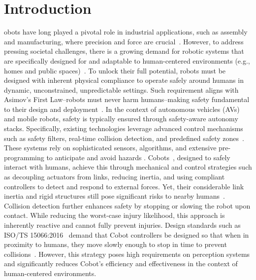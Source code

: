\section{Introduction}
obots have long played a pivotal role in industrial applications, such as assembly and manufacturing, where precision and force are crucial~\citep{todd1996fundamentals}.
However, to address pressing societal challenges, there is a growing demand for robotic systems that are specifically designed for and adaptable to human-centered environments (e.g., homes and public spaces)~\citep{nahavandi2019industry, chibani2013ubiquitous, royakkers2015literature}.
To unlock their full potential, robots must be designed with inherent physical compliance to operate safely around humans in dynamic, unconstrained, unpredictable settings.
Such requirement aligns with Asimov's First Law--robots must never harm humans--making safety fundamental to their design and deployment~\citep{villani2018survey}.
%
In the context of autonomous vehicles (AVs) and mobile robots, safety is typically ensured through safety-aware autonomy stacks. 
Specifically, existing technologies leverage advanced control mechanisms such as safety filters, real-time collision detection, and predefined safety zones~\citep{zhao2024potential}. 
These systems rely on sophisticated sensors, algorithms, and extensive pre-programming to anticipate and avoid hazards \citep{fragapane2021planning}. 
\glspl{Cobot}~\citep{el2019cobot}, designed to safely interact with humans, achieve this through mechanical and control strategies such as decoupling actuators from links, reducing inertia, and using compliant controllers to detect and respond to external forces. 
Yet, their considerable link inertia and rigid structures still pose significant risks to nearby humans~\citep{haddadin2013towards}.
Collision detection further enhances safety by stopping or slowing the robot upon contact. While reducing the worst-case injury likelihood, this approach is inherently reactive and cannot fully prevent injuries.
Design standards such as ISO/TS 15066:2016~\citep{Isots_15066_2016} demand that \gls{Cobot} controllers be designed so that when in proximity to humans, they move slowly enough to stop in time to prevent collisions~\citep{ajoudani2018progress, lucci2020combining}. 
However, this strategy poses high requirements on perception systems and significantly reduces \gls{Cobot}'s efficiency and effectiveness in the context of human-centered environments.

